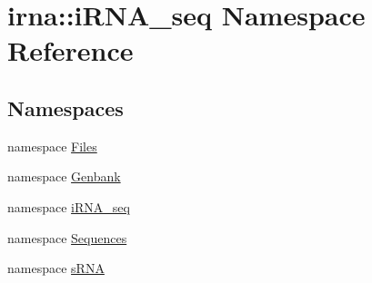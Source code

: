 \hypertarget{namespaceirna_1_1iRNA__seq}{
\section{irna\-:\-:i\-R\-N\-A\-\_\-seq \-Namespace \-Reference}
\label{namespaceirna_1_1iRNA__seq}
}
\subsection*{\-Namespaces}
\begin{DoxyCompactItemize}
\item 
namespace \hyperlink{namespaceirna_1_1iRNA__seq_1_1Files}{\-Files}
\item 
namespace \hyperlink{namespaceirna_1_1iRNA__seq_1_1Genbank}{\-Genbank}
\item 
namespace \hyperlink{namespaceirna_1_1iRNA__seq_1_1iRNA__seq}{i\-R\-N\-A\-\_\-seq}
\item 
namespace \hyperlink{namespaceirna_1_1iRNA__seq_1_1Sequences}{\-Sequences}
\item 
namespace \hyperlink{namespaceirna_1_1iRNA__seq_1_1sRNA}{s\-R\-N\-A}
\end{DoxyCompactItemize}
